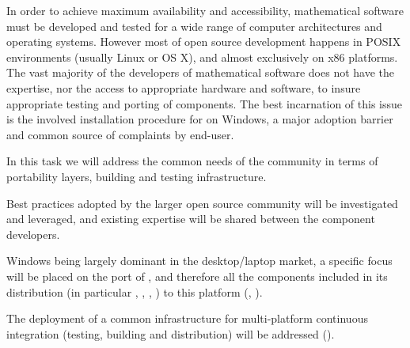 \begin{workpackage}[id=component-architecture,wphases=0-48!.5,
  title=Component Architecture,lead=UV,
  PSRM=64,UVRM=8,SARM=16, USHRM=4, USORM=6, UBRM=12]
  \begin{tasklist}
  \begin{task}[id=portability,title=Portability,lead=UV,PM=28]
    In order to achieve maximum availability and accessibility,
    mathematical software must be developed and tested for a wide range
    of computer architectures and operating systems.  However most of
    open source development happens in POSIX environments (usually
    Linux or OS X), and almost exclusively on x86 platforms.  The vast
    majority of the developers of mathematical software does not have
    the expertise, nor the access to appropriate hardware and software, to insure
    appropriate testing and porting of components.  The best
    incarnation of this issue is the involved installation procedure
    for \Sage on Windows, a major adoption barrier and common source of
    complaints by end-user.

    In this task we will address the common needs of the community in
    terms of portability layers, building and testing infrastructure.

    \begin{compactitem}
    \item Best practices adopted by the larger open source community
      will be investigated and leveraged, and existing expertise will
      be shared between the component developers.
    \item Windows being largely dominant in the desktop/laptop market,
      a specific focus will be placed on the port of \Sage, and
      therefore all the components included in its distribution (in
      particular \PariGP, \GAP, \Singular, \Linbox) to this platform
      (,
      ).
    \item The deployment of a common infrastructure for multi-platform
      continuous integration (testing, building and distribution) will
      be addressed
      ().
    \end{compactitem}


\end{task}
\end{tasklist}
\end{workpackage}
